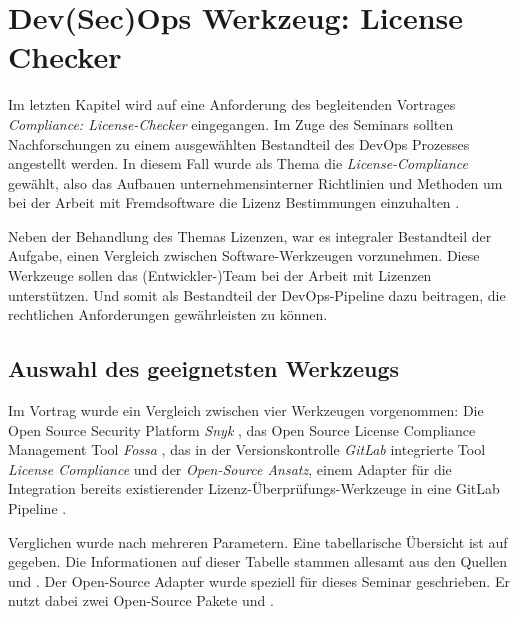 \chapter{Dev(Sec)Ops Werkzeug: License Checker} \label{chapter:license-checker}

Im letzten Kapitel wird auf eine Anforderung des begleitenden Vortrages \emph{Compliance: License-Checker} eingegangen. 
Im Zuge des Seminars sollten Nachforschungen zu einem ausgewählten Bestandteil des DevOps Prozesses angestellt werden. 
In diesem Fall wurde als Thema die \emph{License-Compliance} gewählt, also das Aufbauen unternehmensinterner Richtlinien und Methoden um bei der Arbeit mit Fremdsoftware die Lizenz Bestimmungen einzuhalten \cite{validatisComplianceDefinitionBedeutung} \cite{haufe-lexwaregmbhcokgBedeutungComplianceFuer}.


\begin{sloppypar}
Neben der Behandlung des Themas Lizenzen, war es integraler Bestandteil der Aufgabe, einen Vergleich zwischen Software-Werkzeugen vorzunehmen. Diese Werkzeuge sollen das \mbox{(Entwickler-)Team} bei der Arbeit mit Lizenzen unterstützen. Und somit als Bestandteil der DevOps-Pipeline dazu beitragen, die rechtlichen Anforderungen gewährleisten zu können.
\end{sloppypar}

\section{Auswahl des geeignetsten Werkzeugs}

Im Vortrag wurde ein Vergleich zwischen vier Werkzeugen vorgenommen: Die \glqq Open Source Security Platform\grqq{} \emph{Snyk} \cite{snykLicensingComplianceManagement}, das \glqq Open Source License Compliance Management Tool\grqq{} \emph{Fossa} \cite{fossaOpenSourceLicense}, das in der Versionskontrolle \emph{GitLab} integrierte Tool \emph{License Compliance} \cite{gitlabLicenseComplianceGitLab} und der \emph{Open-Source Ansatz}, einem Adapter für die Integration bereits existierender Lizenz-Überprüfungs-Werkzeuge in eine GitLab Pipeline \cite{kellOpenSourceLicenseChecker2021}.

Verglichen wurde nach mehreren Parametern. Eine tabellarische Übersicht ist auf  gegeben. Die Informationen auf dieser Tabelle stammen allesamt aus den Quellen \cite{snykLicensingComplianceManagement} \cite{fossaOpenSourceLicense} und \cite{gitlabLicenseComplianceGitLab}. Der Open-Source Adapter wurde speziell für dieses Seminar geschrieben. Er nutzt dabei zwei Open-Source Pakete \cite{glassNPMLicenseChecker} und \cite{bauernfeindComposerLicenseChecker}.

